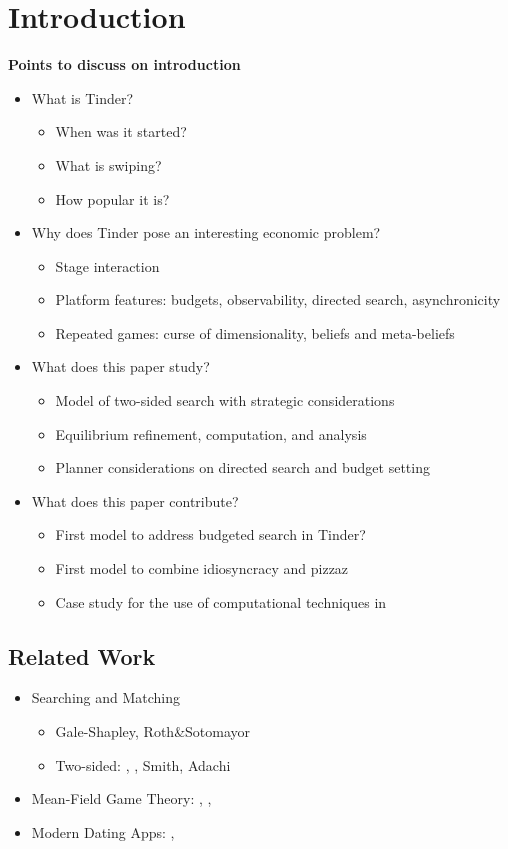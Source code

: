 \section{Introduction}
\label{sec:Introduction} 
\textbf{Points to discuss on introduction}
\begin{itemize}
    \item What is Tinder?
    \begin{itemize}
        \item When was it started?
        \item What is swiping?
        \item How popular it is?
    \end{itemize}
    \item Why does Tinder pose an interesting economic problem?
    \begin{itemize}
        \item Stage interaction
        \item Platform features: budgets, observability, directed search, asynchronicity
        \item Repeated games: curse of dimensionality, beliefs and meta-beliefs
    \end{itemize}
    \item What does this paper study?
    \begin{itemize}
        \item Model of two-sided search with strategic considerations
        \item Equilibrium refinement, computation, and analysis
        \item Planner considerations on directed search and budget setting
    \end{itemize}
    \item What does this paper contribute?
    \begin{itemize}
        \item First model to address budgeted search in Tinder?
        \item First model to combine idiosyncracy and pizzaz
        \item Case study for the use of computational techniques in 
    \end{itemize}
\end{itemize}
\subsection{Related Work}
\begin{itemize}
    \item Searching and Matching
    \begin{itemize}
        \item Gale-Shapley, Roth\&Sotomayor
        \item Two-sided: \cite{burdett1998two}, \cite{chade2006matching}, Smith, Adachi
    \end{itemize}
    \item Mean-Field Game Theory: \cite{iyer2014mean}, \cite{gummadi2013optimal}, \cite{jovanovic1988anonymous}
    \item Modern Dating Apps: \cite{olmeda2021towards}, \cite{kanoria2021facilitating}
\end{itemize}